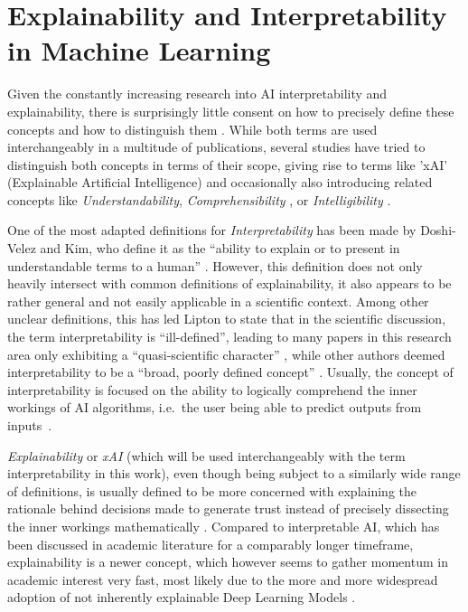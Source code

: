 


\section{Explainability and Interpretability in Machine Learning}\label{sec:Explainability}

Given the constantly increasing research into AI interpretability and explainability, there is surprisingly little consent on how to precisely define these concepts and how to distinguish them \parencite{Linardatos2021}. 
While both terms are used interchangeably in a multitude of publications, several studies have tried to distinguish both concepts in terms of their scope, giving rise to terms like 'xAI' (Explainable Artificial Intelligence) \parencite{Gunning2019} and occasionally also introducing related concepts like \textit{Understandability}, \textit{Comprehensibility} \parencite{Guidotti2018}, or \textit{Intelligibility} \parencite{Caruana2015}.

One of the most adapted definitions for \textit{Interpretability} has been made by Doshi-Velez and Kim, who define it as the “ability to explain or to present in understandable terms to a human” \parencite{DoshiVelez2017}. 
However, this definition does not only heavily intersect with common definitions of explainability, it also appears to be rather general and not easily applicable in a scientific context. 
Among other unclear definitions, this has led Lipton to state that in the scientific discussion, the term interpretability is “ill-defined”, leading to many papers in this research area only exhibiting a “quasi-scientific character” \parencite{Lipton2018}, while other authors deemed interpretability to be a “broad, poorly defined concept” \parencite{Murdoch2019}. 
Usually, the concept of interpretability is focused on the ability to logically comprehend the inner workings of AI algorithms, i.e.\ the user being able to predict outputs from inputs~\parencite{Kim2016}.

\textit{Explainability} or \textit{xAI} (which will be used interchangeably with the term interpretability in this work), even though being subject to a similarly wide range of definitions, is usually defined to be more concerned with explaining the rationale behind decisions made to generate trust instead of precisely dissecting the inner workings mathematically \parencite{Gunning2019}. 
Compared to interpretable AI, which has been discussed in academic literature for a comparably longer timeframe, explainability is a newer concept, which however seems to gather momentum in academic interest very fast, most likely due to the more and more widespread adoption of not inherently explainable Deep Learning Models \parencite{BarredoArrieta2020}.


